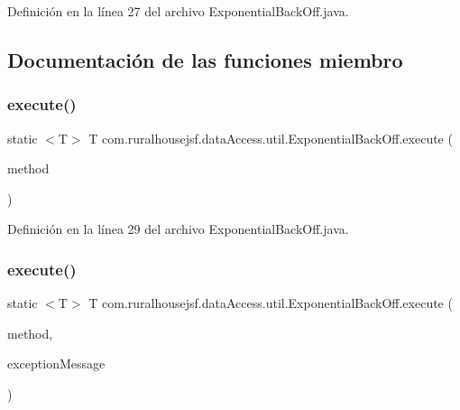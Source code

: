 Definición en la línea 27 del archivo Exponential\+Back\+Off.\+java.



\subsection{Documentación de las funciones miembro}
\mbox{\label{classcom_1_1ruralhousejsf_1_1data_access_1_1util_1_1_exponential_back_off_a7c14ce7a46732baa58e3b0bf06455a9b}} 
\subsubsection{\texorpdfstring{execute()}{execute()}\hspace{0.1cm}{\footnotesize\ttfamily [1/2]}}
{\footnotesize\ttfamily static $<$T$>$ T com.\+ruralhousejsf.\+data\+Access.\+util.\+Exponential\+Back\+Off.\+execute (\begin{DoxyParamCaption}\item[{\mbox{\hyperlink{interfacecom_1_1ruralhousejsf_1_1data_access_1_1util_1_1_exponential_back_off_interface}{Exponential\+Back\+Off\+Interface}}$<$ T $>$}]{method }\end{DoxyParamCaption})\hspace{0.3cm}{\ttfamily [static]}}



Definición en la línea 29 del archivo Exponential\+Back\+Off.\+java.

\mbox{\label{classcom_1_1ruralhousejsf_1_1data_access_1_1util_1_1_exponential_back_off_a67faf7d5bf9a822979a6531ffc86a60d}} 
\subsubsection{\texorpdfstring{execute()}{execute()}\hspace{0.1cm}{\footnotesize\ttfamily [2/2]}}
{\footnotesize\ttfamily static $<$T$>$ T com.\+ruralhousejsf.\+data\+Access.\+util.\+Exponential\+Back\+Off.\+execute (\begin{DoxyParamCaption}\item[{\mbox{\hyperlink{interfacecom_1_1ruralhousejsf_1_1data_access_1_1util_1_1_exponential_back_off_interface}{Exponential\+Back\+Off\+Interface}}$<$ T $>$}]{method,  }\item[{String}]{exception\+Message }\end{DoxyParamCaption})\hspace{0.3cm}{\ttfamily [static]}}



